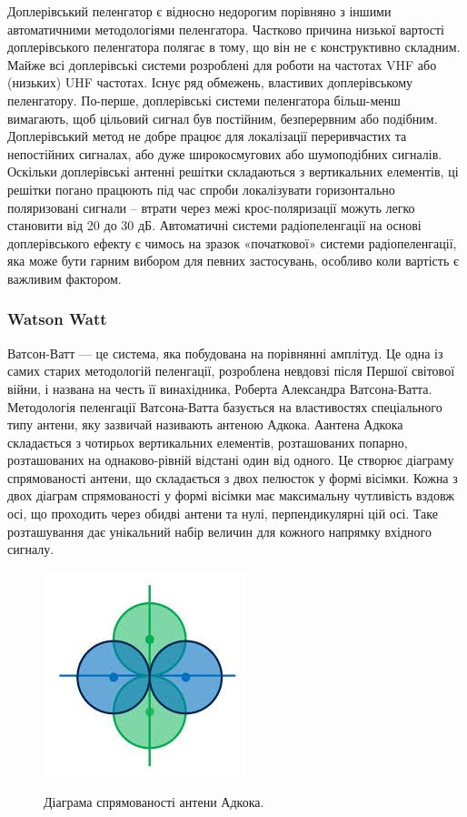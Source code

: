 \documentclass{article}
\begin{document}
Доплерівський пеленгатор є відносно недорогим порівняно з іншими автоматичними методологіями пеленгатора. Частково причина низької вартості доплерівського пеленгатора полягає в тому, що він не є конструктивно складним. Майже всі доплерівські системи розроблені для роботи на частотах VHF або (низьких) UHF частотах. Існує ряд обмежень, властивих доплерівському пеленгатору. По-перше, доплерівські системи пеленгатора більш-менш вимагають, щоб цільовий сигнал був постійним, безперервним або подібним. Доплерівський метод не добре працює для локалізації переривчастих та непостійних сигналах, або дуже широкосмугових або шумоподібних сигналів. Оскільки доплерівські антенні решітки складаються з вертикальних елементів, ці решітки погано працюють під час спроби локалізувати горизонтально поляризовані сигнали – втрати через межі крос-поляризації можуть легко становити від 20 до 30 дБ. Автоматичні системи радіопеленгації на основі доплерівського ефекту є чимось на зразок «початкової» системи радіопеленгації, яка може бути гарним вибором для певних застосувань, особливо коли вартість є важливим фактором.

\subsubsection{Watson Watt}
Ватсон-Ватт — це система, яка побудована на порівнянні амплітуд. Це одна із самих старих методологій пеленгації, розроблена невдовзі після Першої світової війни, і названа на честь її винахідника, Роберта Александра Ватсона-Ватта. Методологія пеленгації Ватсона-Ватта базується на властивостях спеціального типу антени, яку зазвичай називають антеною Адкока. Аантена Адкока складається з чотирьох вертикальних елементів, розташованих попарно, розташованих на однаково-рівній відстані один від одного. Це створює діаграму спрямованості антени, що складається з двох пелюсток у формі вісімки. Кожна з двох діаграм спрямованості у формі вісімки має максимальну чутливість вздовж осі, що проходить через обидві антени та нулі, перпендикулярні цій осі. Таке розташування дає унікальний набір величин для кожного напрямку вхідного сигналу.


\begin{figure}[H]
	\centering
	{\includegraphics[width=0.2\linewidth]{images/adkock_antenna.jpeg}}
	\caption{\label{fig:rdf:dopler} Діаграма спрямованості антени Адкока.}
\end{figure}
\end{document}
